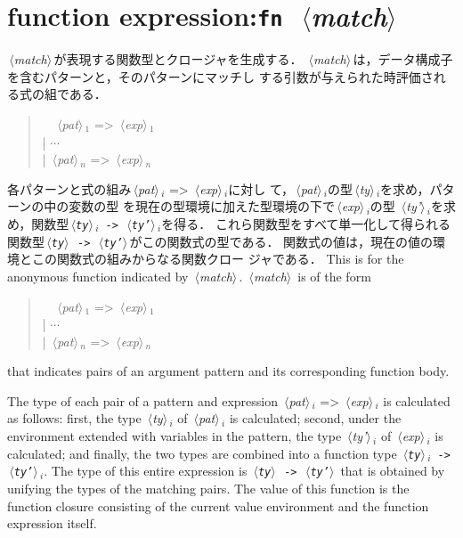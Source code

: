 \documentclass{jbook}
\newcommand{\txt}[2]{#2}
\newcommand{\code}[1]{\mbox{\large\tt #1}}
\newcommand{\nonterm}[1]{\mbox{$\,\langle$}{\it #1}\mbox{$\rangle\,$}}
\newcommand{\term}[1]{\mbox{{\tt #1}}}
\newcommand{\myem}{\mbox{\ \ }}
\newenvironment{program}{\begin{quote}\begin{tt}}%
                        {\end{tt}\end{quote}}
\begin{document}
\section{\txt{関数式}{function expression}:\term{fn}\ \nonterm{match}}
\label{sec:reference:fnexpression}
\ifjp%
	\nonterm{match}が表現する関数型とクロージャを生成する．
	\nonterm{match}は，データ構成子を含むパターンと，そのパターンにマッチし
する引数が与えられた時評価される式の組である．
\begin{program}
\myem  \nonterm{pat}$_1$ => \nonterm{exp}$_1$
\\
| $\cdots$
\\
| \nonterm{pat}$_n$ => \nonterm{exp}$_n$
\end{program}
	各パターンと式の組み\nonterm{pat}$_i$ => \nonterm{exp}$_i$に対し
て，\nonterm{pat}$_i$の型\nonterm{ty}$_i$を求め，パターンの中の変数の型
を現在の型環境に加えた型環境の下で\nonterm{exp}$_i$の型
\nonterm{ty'}$_i$を求め，関数型\code{\nonterm{ty}$_i$ ->
\nonterm{ty'}$_i$}を得る．
	これら関数型をすべて単一化して得られる関数型\code{\nonterm{ty}
-> \nonterm{ty'}}がこの関数式の型である．
	関数式の値は，現在の値の環境とこの関数式の組みからなる関数クロー
ジャである．
\else%
	This is for the anonymous function indicated
 by \nonterm{match}.
	\nonterm{match} is of the form
\begin{program}
\myem  \nonterm{pat}$_1$ => \nonterm{exp}$_1$
\\
| $\cdots$
\\
| \nonterm{pat}$_n$ => \nonterm{exp}$_n$
\end{program}
that indicates pairs of an argument pattern and its corresponding
function body.

	The type of each pair of a pattern and expression
\nonterm{pat}$_i$ => \nonterm{exp}$_i$ is calculated as follows:
	first, the type \nonterm{ty}$_i$ of \nonterm{pat}$_i$ is
calculated;
	second, under the environment extended with variables in
the pattern, the type \nonterm{ty'}$_i$ of \nonterm{exp}$_i$ is
calculated;
	and finally, the two types are combined into a function type
\code{\nonterm{ty}$_i$ -> \nonterm{ty'}$_i$}.
	The type of this entire expression is
\code{\nonterm{ty} -> \nonterm{ty'}}
that is obtained by
unifying the types of the matching pairs.
	The value of this function is the function closure
consisting of the current value environment and the function
expression itself.
\fi%
\end{document}
